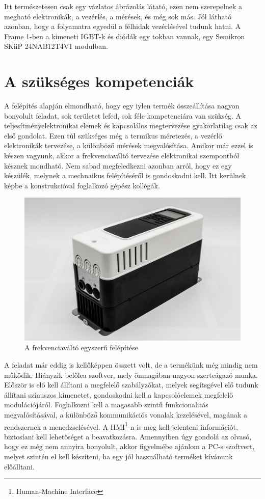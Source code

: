 Itt természetesen csak egy vázlatos ábrázolás látató, ezen nem szerepelnek a megható elektronikák, a vezérlés, a mérések, és még sok más. Jól látható azonban, hogy a folyamatra egyedül a félhidak vezérlésével tudunk hatni. A Frame 1-ben a kimeneti IGBT-k és diódák egy tokban vannak, egy Semikron SKiiP 24NAB12T4V1 modulban.

\section{A szükséges kompetenciák}

A felépítés alapján elmondható, hogy egy iylen termék összeállítása nagyon bonyolult feladat, sok területet lefed, sok féle kompetenciára van szükség. A teljesítményelektronikai elemek és kapcsolálos megtervezése gyakorlatilag csak az első gondolat. Ezen túl szükséges még a termikus méretezés, a vezérlő elektronikák tervezése, a különböző mérések megvalósítása. Amikor már ezzel is készen vagyunk, akkor a frekvenciaváltó tervezése elektronikai szempontból késznek mondható. Nem sabad megfeledkezni azonban arról, hogy ez egy készülék, melynek a mechnaikus felépítéséről is gondoskodni kell. Itt kerülnek képbe a konstrukcióval foglalkozó gépész kollégák.

\begin{figure}[h]
	\centering
	\includegraphics[width = \textwidth]{figures/n700_proto.jpg}
	\caption{A frekvenciaváltó egyszerű felépítése} 
	\label{fig:n700_proto}
\end{figure}

A feladat már eddig is kellőképpen összett volt, de a termékünk még mindig nem működik. Hiányzik belőlea szoftver, mely önmagában nagyon szerteágazó munka. Először is elő kell állítani a megfelelő szabályzókat, melyek segítsgével elő tudunk állítani színuszos kimenetet, gondoskodni kell a kapcsolóelemek megfelelő modulációjáról. Foglalkozni kell a magasabb szintű funkcionalitás megvalósításával, a különböző kommunikációs vonalak kezelésével, magának a rendszernek a menedzselésével. A HMI\footnote{Human-Machine Interface}-n is meg kell jelenteni információt, biztosíani kell lehetőséget a beavatkozásra. Amennyiben úgy gondolá az olvasó, hogy ez még nem annyira bonyolult, akkor figyelmébe ajánlom a PC-s szoftvert, melyet szintén el kell készíteni, ha egy jól használható terméket kívánunk előálltani.


